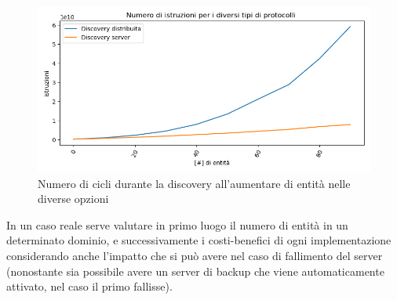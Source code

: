\begin{figure}[H]
    \includegraphics[width=\textwidth]{./results/test0_istruzioni.png} 
    \caption{Numero di cicli durante la discovery all'aumentare di entità nelle diverse opzioni}\label{fig:test0_instr}
\end{figure}
In un caso reale serve valutare in primo luogo il numero di entità in un determinato dominio, e successivamente i costi-benefici di ogni implementazione considerando anche l'impatto che si può avere nel caso di fallimento del server (nonostante sia possibile avere un server di backup che viene automaticamente attivato, nel caso il primo fallisse).

